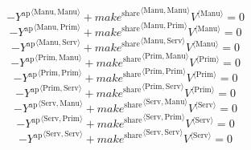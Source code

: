 \begin{equation}
-{Y^{\mathrm{ap}}}^{\langle \mathrm{Manu},\mathrm{Manu}\rangle} + {{{m\!a\!k\!e}^{\mathrm{share}}}^{\langle \mathrm{\mathrm{Manu}},\mathrm{\mathrm{Manu}}\rangle}} {{V}^{\langle \mathrm{Manu}\rangle}} = 0
\end{equation}
\begin{equation}
-{Y^{\mathrm{ap}}}^{\langle \mathrm{Manu},\mathrm{Prim}\rangle} + {{{m\!a\!k\!e}^{\mathrm{share}}}^{\langle \mathrm{\mathrm{Manu}},\mathrm{\mathrm{Prim}}\rangle}} {{V}^{\langle \mathrm{Manu}\rangle}} = 0
\end{equation}
\begin{equation}
-{Y^{\mathrm{ap}}}^{\langle \mathrm{Manu},\mathrm{Serv}\rangle} + {{{m\!a\!k\!e}^{\mathrm{share}}}^{\langle \mathrm{\mathrm{Manu}},\mathrm{\mathrm{Serv}}\rangle}} {{V}^{\langle \mathrm{Manu}\rangle}} = 0
\end{equation}
\begin{equation}
-{Y^{\mathrm{ap}}}^{\langle \mathrm{Prim},\mathrm{Manu}\rangle} + {{{m\!a\!k\!e}^{\mathrm{share}}}^{\langle \mathrm{\mathrm{Prim}},\mathrm{\mathrm{Manu}}\rangle}} {{V}^{\langle \mathrm{Prim}\rangle}} = 0
\end{equation}
\begin{equation}
-{Y^{\mathrm{ap}}}^{\langle \mathrm{Prim},\mathrm{Prim}\rangle} + {{{m\!a\!k\!e}^{\mathrm{share}}}^{\langle \mathrm{\mathrm{Prim}},\mathrm{\mathrm{Prim}}\rangle}} {{V}^{\langle \mathrm{Prim}\rangle}} = 0
\end{equation}
\begin{equation}
-{Y^{\mathrm{ap}}}^{\langle \mathrm{Prim},\mathrm{Serv}\rangle} + {{{m\!a\!k\!e}^{\mathrm{share}}}^{\langle \mathrm{\mathrm{Prim}},\mathrm{\mathrm{Serv}}\rangle}} {{V}^{\langle \mathrm{Prim}\rangle}} = 0
\end{equation}
\begin{equation}
-{Y^{\mathrm{ap}}}^{\langle \mathrm{Serv},\mathrm{Manu}\rangle} + {{{m\!a\!k\!e}^{\mathrm{share}}}^{\langle \mathrm{\mathrm{Serv}},\mathrm{\mathrm{Manu}}\rangle}} {{V}^{\langle \mathrm{Serv}\rangle}} = 0
\end{equation}
\begin{equation}
-{Y^{\mathrm{ap}}}^{\langle \mathrm{Serv},\mathrm{Prim}\rangle} + {{{m\!a\!k\!e}^{\mathrm{share}}}^{\langle \mathrm{\mathrm{Serv}},\mathrm{\mathrm{Prim}}\rangle}} {{V}^{\langle \mathrm{Serv}\rangle}} = 0
\end{equation}
\begin{equation}
-{Y^{\mathrm{ap}}}^{\langle \mathrm{Serv},\mathrm{Serv}\rangle} + {{{m\!a\!k\!e}^{\mathrm{share}}}^{\langle \mathrm{\mathrm{Serv}},\mathrm{\mathrm{Serv}}\rangle}} {{V}^{\langle \mathrm{Serv}\rangle}} = 0
\end{equation}
